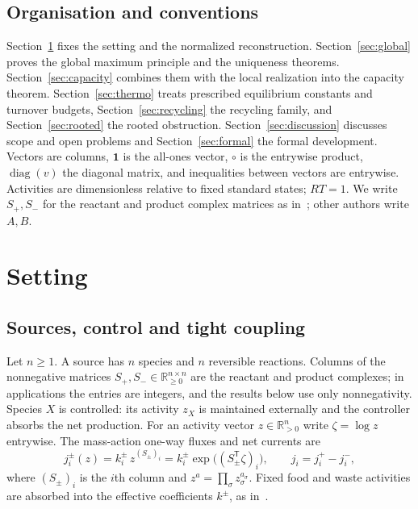 \documentclass[11pt,a4paper]{article}
\theoremstyle{plain}
\theoremstyle{definition}
\theoremstyle{remark}
\numberwithin{equation}{section}
\newcommand{\R}{\mathbb{R}}
\newcommand{\T}{\mathsf{T}}
\newcommand{\Sp}{S_{+}}
\newcommand{\Sm}{S_{-}}
\newcommand{\one}{\mathbf{1}}
\newcommand{\Diag}{\operatorname{diag}}
\renewcommand{\odot}{\circ}
\begin{document}
\subsection{Organisation and conventions}
Section~\ref{sec:setting} fixes the setting and the normalized reconstruction. Section~\ref{sec:global} proves the global maximum principle and the uniqueness theorems. Section~\ref{sec:capacity} combines them with the local realization into the capacity theorem. Section~\ref{sec:thermo} treats prescribed equilibrium constants and turnover budgets, Section~\ref{sec:recycling} the recycling family, and Section~\ref{sec:rooted} the rooted obstruction. Section~\ref{sec:discussion} discusses scope and open problems and Section~\ref{sec:formal} the formal development. Vectors are columns, $\one$ is the all-ones vector, $\odot$ is the entrywise product, $\Diag(v)$ the diagonal matrix, and inequalities between vectors are entrywise. Activities are dimensionless relative to fixed standard states; $RT=1$. We write $\Sp,\Sm$ for the reactant and product complex matrices as in~\citep{companion2026}; other authors write $A,B$.

\section{Setting}\label{sec:setting}

\subsection{Sources, control and tight coupling}
Let $n\ge1$. A source has $n$ species and $n$ reversible reactions. Columns of the nonnegative matrices $\Sp,\Sm\in\R^{n\times n}_{\ge0}$ are the reactant and product complexes; in applications the entries are integers, and the results below use only nonnegativity. Species $X$ is controlled: its activity $z_X$ is maintained externally and the controller absorbs the net production. For an activity vector $z\in\R^n_{>0}$ write $\zeta=\log z$ entrywise. The mass-action one-way fluxes and net currents are~\citep{hornjackson1972,feinberg2019}
\begin{equation}\label{eq:massaction}
 j^\pm_i(z)=k^\pm_i\,z^{(S_\pm)_i}=k^\pm_i\exp\big((S_\pm^{\T}\zeta)_i\big),\qquad j_i=j^+_i-j^-_i,
\end{equation}
where $(S_\pm)_i$ is the $i$th column and $z^{a}=\prod_\sigma z_\sigma^{a_\sigma}$. Fixed food and waste activities are absorbed into the effective coefficients $k^\pm$, as in~\citep{despons2024}.
\end{document}
